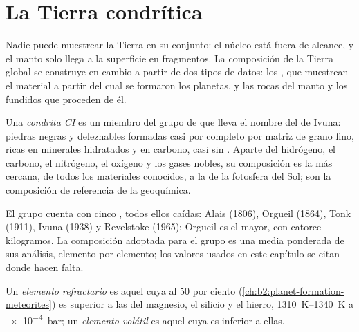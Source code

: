 \section{La Tierra condrítica}

Nadie puede muestrear la Tierra en su conjunto: el núcleo está fuera de alcance, y el
manto solo llega a la superficie en fragmentos. La composición de la Tierra global
se construye en cambio a partir de dos tipos de datos: los , que muestrean el
material a partir del cual se formaron los planetas, y las rocas del manto y los
fundidos que proceden de él.

\begin{definition}[Condrita CI]\label{def:b2:elements-in-the-earth:ci}
Una \emph{condrita CI} es un miembro del grupo de
 que lleva el nombre del  de Ivuna: piedras negras y deleznables
formadas casi por completo por matriz de grano fino, ricas en minerales hidratados y en
carbono, casi sin . Aparte del hidrógeno, el carbono, el nitrógeno, el oxígeno y los
gases nobles, su composición es la más cercana, de todos los materiales conocidos, a la de
la fotosfera del Sol; son la composición de referencia de la geoquímica.
\end{definition}

El grupo cuenta con cinco , todos ellos caídas: Alais (1806), Orgueil
(1864), Tonk (1911), Ivuna (1938) y Revelstoke (1965); Orgueil es el mayor,
con catorce kilogramos. La composición adoptada para el grupo es una media ponderada
de sus análisis, elemento por elemento; los valores usados en este capítulo se
citan donde hacen falta.

\begin{definition}
\label{def:b2:elements-in-the-earth:volatility}
Un \emph{elemento refractario} es aquel cuya 
al 50 por ciento (\cref{ch:b2:planet-formation-meteorites}) es superior a
las del magnesio, el silicio y el hierro, \qtyrange{1310}{1340}{K} a
\qty{e-4}{bar}; un
\emph{elemento volátil} es aquel cuya 
es inferior a ellas.
\end{definition}

